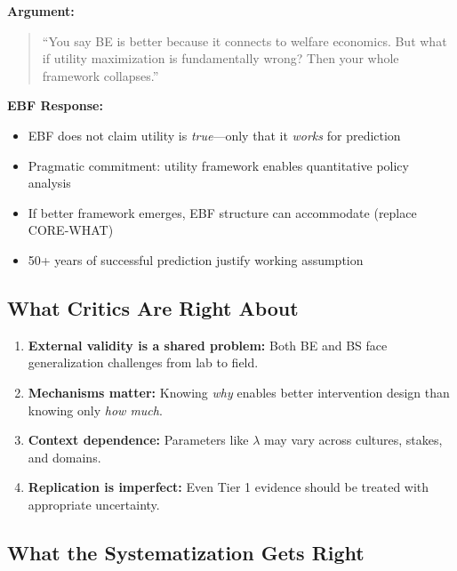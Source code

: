 \documentclass[11pt, a4paper]{article}
\begin{document}
\begin{tcolorbox}[colback=red!5!white, colframe=red!75!black,
    title=Critique 3: Utility Framework Commitment]

\textbf{Argument:}
\begin{quote}
``You say BE is better because it connects to welfare economics. But what if utility maximization is fundamentally wrong? Then your whole framework collapses.''
\end{quote}

\textbf{EBF Response:}
\begin{itemize}[nosep]
    \item EBF does not claim utility is \textit{true}---only that it \textit{works} for prediction
    \item Pragmatic commitment: utility framework enables quantitative policy analysis
    \item If better framework emerges, EBF structure can accommodate (replace CORE-WHAT)
    \item 50+ years of successful prediction justify working assumption
\end{itemize}

\end{tcolorbox}

\subsection{What Critics Are Right About}

\begin{enumerate}
\item \textbf{External validity is a shared problem:} Both BE and BS face generalization challenges from lab to field.

\item \textbf{Mechanisms matter:} Knowing \textit{why} enables better intervention design than knowing only \textit{how much}.

\item \textbf{Context dependence:} Parameters like $\lambda$ may vary across cultures, stakes, and domains.

\item \textbf{Replication is imperfect:} Even Tier 1 evidence should be treated with appropriate uncertainty.
\end{enumerate}

\subsection{What the Systematization Gets Right}
\end{document}
